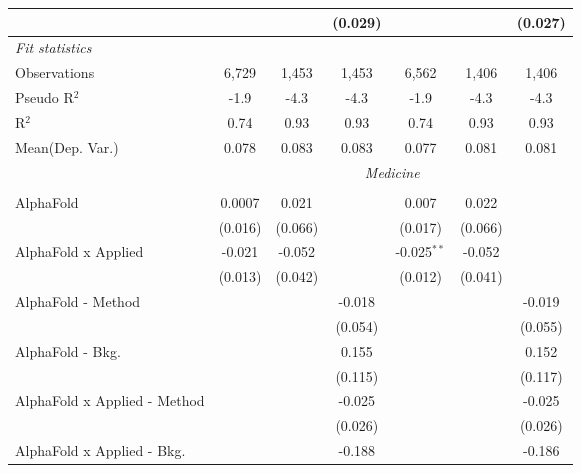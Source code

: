 \begin{tabular}{lcccccc}
                                &              &         & (0.029) &               &             & (0.027)\\   
   \midrule
   \emph{Fit statistics}\\
   Observations                 & 6,729        & 1,453   & 1,453   & 6,562         & 1,406       & 1,406\\  
   Pseudo R$^2$                 & -1.9         & -4.3    & -4.3    & -1.9          & -4.3        & -4.3\\  
   R$^2$                        & 0.74         & 0.93    & 0.93    & 0.74          & 0.93        & 0.93\\  
   
Mean(Dep. Var.) & 0.078 & 0.083 & 0.083 & 0.077 & 0.081 & 0.081 \\
 & \multicolumn{6}{c}{\textit{Medicine}} \\ \\
   AlphaFold                    & 0.0007        & 0.021   &             & 0.007         & 0.022   &   \\   
                                & (0.016)       & (0.066) &             & (0.017)       & (0.066) &   \\   
   AlphaFold x Applied          & -0.021        & -0.052  &             & -0.025$^{**}$ & -0.052  &   \\   
                                & (0.013)       & (0.042) &             & (0.012)       & (0.041) &   \\   
   AlphaFold - Method           &               &         & -0.018      &               &         & -0.019\\   
                                &               &         & (0.054)     &               &         & (0.055)\\   
   AlphaFold - Bkg.             &               &         & 0.155       &               &         & 0.152\\   
                                &               &         & (0.115)     &               &         & (0.117)\\   
   AlphaFold x Applied - Method &               &         & -0.025      &               &         & -0.025\\   
                                &               &         & (0.026)     &               &         & (0.026)\\   
   AlphaFold x Applied - Bkg.   &               &         & -0.188      &               &         & -0.186\\   

\end{tabular}
